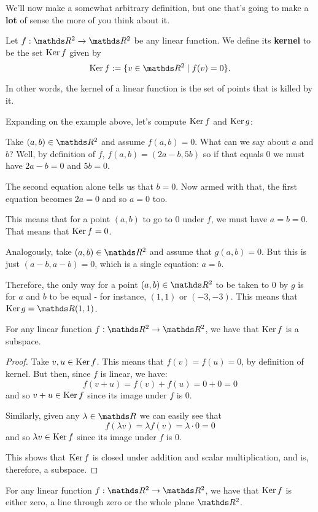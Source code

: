 We'll now make a somewhat arbitrary definition, but one that's going to make a \textbf{lot} of sense the more of you think about it.

\begin{df}
	Let $f:\R^2\to\R^2$ be any linear function. We define its \textbf{kernel} to be the set $\operatorname{Ker} f$ given by
	\[\Ker f:=\{v\in \R^2\mid f(v)=0\}.\]
\end{df}

In other words, the kernel of a linear function is the set of points that is killed by it.

\begin{ex}
	Expanding on the example above, let's compute $\operatorname{Ker} f$ and $\operatorname{Ker} g$:
	
	Take $(a,b)\in \R^2$ and assume $f(a,b)=0$. What can we say about $a$ and $b$? Well, by definition of $f$, $f(a,b)=(2a-b,5b)$ so if that equals 0 we must have $2a-b=0$ and $5b=0$.
	
	The second equation alone tells us that $b=0$. Now armed with that, the first equation becomes $2a=0$ and so $a=0$ too.
	
	This means that for a point $(a,b)$ to go to 0 under $f$, we must have $a=b=0$. That means that $\operatorname{Ker} f=0$.
	
	\bigskip
	Analogously, take $(a,b)\in \R^2$ and assume that $g(a,b)=0$. But this is just $(a-b,a-b)=0$, which is a single equation: $a=b$.
	
	Therefore, the only way for a point $(a,b)\in\R^2$ to be taken to 0 by $g$ is for $a$ and $b$ to be equal - for instance, $(1,1)$ or $(-3,-3)$. This means that $\Ker g=\R(1,1)$.
\end{ex}

\begin{lemma}
	For any linear function $f:\R^2\to\R^2$, we have that $\operatorname{Ker} f$ is a subspace.
\end{lemma}
\begin{proof}
	Take $v,u\in \operatorname{Ker} f$. This means that $f(v)=f(u)=0$, by definition of kernel. But then, since $f$ is linear, we have:
	\[f(v+u)=f(v)+f(u)=0+0=0\]and so $v+u\in\operatorname{Ker} f$ since its image under $f$ is 0.
	
	Similarly, given any $\lambda\in \R$ we can easily see that
	\[f(\lambda v)=\lambda f(v)=\lambda\cdot 0=0\]and so $\lambda v\in\operatorname{Ker} f$ since its image under $f$ is 0.
	
	This shows that $\operatorname{Ker} f$ is closed under addition and scalar multiplication, and is, therefore, a subspace.
\end{proof}
\begin{cor}
	For any linear function $f:\R^2\to\R^2$, we have that $\operatorname{Ker} f$ is either zero, a line through zero or the whole plane $\R^2$.
\end{cor}

